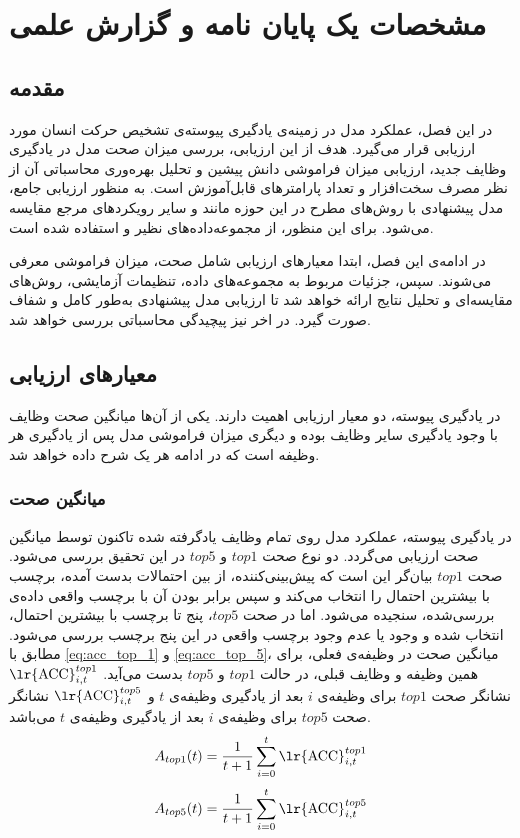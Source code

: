 \chapter{مشخصات یک پایان نامه و گزارش علمی}
\section{مقدمه}
در این فصل، عملکرد مدل  در زمینه‌ی یادگیری پیوسته‌ی تشخیص حرکت انسان مورد ارزیابی قرار می‌گیرد. هدف از این ارزیابی، بررسی میزان صحت مدل در یادگیری وظایف جدید، ارزیابی میزان فراموشی دانش پیشین و تحلیل بهره‌وری محاسباتی آن از نظر مصرف سخت‌افزار و تعداد پارامترهای قابل‌آموزش است. به منظور ارزیابی جامع، مدل پیشنهادی با روش‌های مطرح در این حوزه مانند  \cite{pivot}و سایر رویکردهای مرجع مقایسه می‌شود. برای این منظور، از مجموعه‌داده‌های نظیر  \cite{ucf101} و  \cite{hmdb51} استفاده شده است.

در ادامه‌ی‌ این فصل، ابتدا معیارهای ارزیابی شامل صحت، میزان فراموشی معرفی می‌شوند. سپس، جزئیات مربوط به مجموعه‌های داده، تنظیمات آزمایشی، روش‌های مقایسه‌ای و تحلیل نتایج ارائه خواهد شد تا ارزیابی مدل پیشنهادی به‌طور کامل و شفاف صورت گیرد. در اخر نیز پیچیدگی محاسباتی بررسی خواهد شد. 

\section{معیار‌های ارزیابی}
در یادگیری پیوسته، دو معیار ارزیابی اهمیت دارند. یکی از آن‌ها میانگین صحت وظایف با وجود یادگیری سایر وظایف بوده و دیگری میزان فراموشی مدل پس از یادگیری هر وظیفه است که در ادامه هر یک شرح داده خواهد شد. 
 

\subsection{میانگین صحت}
در یادگیری پیوسته، عملکرد مدل روی تمام وظایف یادگرفته شده تاکنون توسط میانگین صحت ارزیابی می‌گردد. دو نوع صحت $top1$ و $top5$ در این تحقیق بررسی می‌شود. صحت $top1$ بیان‌گر این است که پیش‌بینی‌کننده، از بین احتمالات بدست آمده، برچسب با بیشترین احتمال را انتخاب می‌کند و سپس برابر بودن آن با برچسب واقعی داده‌ی بررسی‌شده، سنجیده می‌‌شود. اما در صحت $top5$، پنج تا برچسب با بیشترین احتمال، انتخاب شده و وجود یا عدم وجود برچسب واقعی در این پنج برچسب بررسی می‌شود. مطابق با \eqref{eq:acc_top_1} و \eqref{eq:acc_top_5}، میانگین صحت در وظیفه‌ی فعلی، برای همین وظیفه و وظایف قبلی، در حالت $top1$ و $top5$ بدست می‌آید. $\text{\lr{ACC}}^{top1}_{i,t}$ نشانگر صحت $top1$ برای وظیفه‌ی $i$ بعد از یادگیری وظیفه‌ی $t$ و $\text{\lr{ACC}}^{top5}_{i,t}$ نشانگر صحت $top5$ برای وظیفه‌ی $i$ بعد از یادگیری وظیفه‌ی $t$ می‌باشد.
\begin{equation}\label{eq:acc_top_1}
	A_{top1}(t) = \frac{1}{t+1} \sum_{i=0}^{t} \text{\lr{ACC}}^{top1}_{i,t}
\end{equation}
\begin{equation}\label{eq:acc_top_5}
	A_{top5}(t) = \frac{1}{t+1} \sum_{i=0}^{t} \text{\lr{ACC}}^{top5}_{i,t}
\end{equation}

